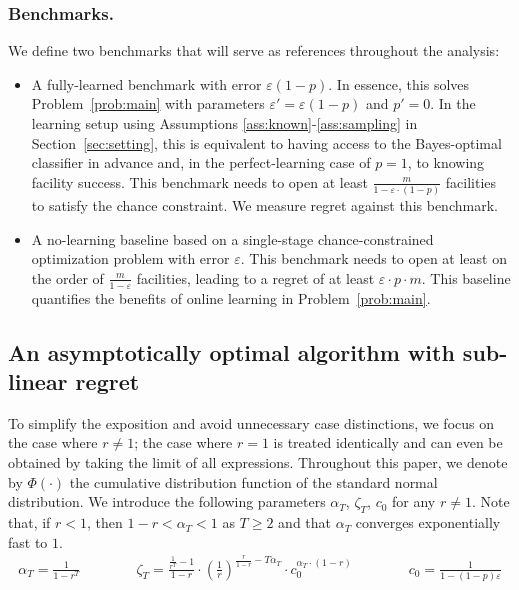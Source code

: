 \documentclass[nonblindrev]{informs3noheader}
\begin{document}
\subsubsection*{Benchmarks.}

We define two benchmarks that will serve as references throughout the analysis:
\begin{itemize}
	\item[--] A fully-learned benchmark with error $\varepsilon (1-p)$. In essence, this solves Problem~\ref{prob:main} with parameters $\varepsilon' = \varepsilon(1-p)$ and $p' = 0$. In the learning setup using Assumptions \ref{ass:known}-\ref{ass:sampling} in Section~\ref{sec:setting}, this is equivalent to having access to the Bayes-optimal classifier in advance and, in the perfect-learning case of $p=1$, to knowing facility success. This benchmark needs to open at least $\frac{m}{1-\varepsilon\cdot(1-p)}$ facilities to satisfy the chance constraint. We measure regret against this benchmark.
	\item[--] A no-learning baseline based on a single-stage chance-constrained optimization problem with error $\varepsilon$. This benchmark needs to open at least on the order of $\frac{m}{1-\varepsilon}$ facilities, leading to a regret of at least $\varepsilon\cdot p\cdot m$. This baseline quantifies the benefits of online learning in Problem~\eqref{prob:main}.
\end{itemize}

\subsection{An asymptotically optimal algorithm with sub-linear regret}

To simplify the exposition and avoid unnecessary case distinctions, we focus on the case where $r\neq1$; the case where $r=1$ is treated identically and can even be obtained by taking the limit of all expressions. Throughout this paper, we denote by $\Phi(\cdot)$ the cumulative distribution function of the standard normal distribution. We introduce the following parameters $\alpha_T$, $\zeta_T$, $c_0$ for any $r\neq1$. Note that, if $r<1$, then $1-r<\alpha_T<1$ as $T\geq2$ and that $\alpha_T$ converges exponentially fast to $1$.
\begin{align*}
	\alpha_T=\frac{1}{1-r^T}\qquad\qquad
	\zeta_T=\frac{\frac{1}{r^T}-1}{1-r}\cdot\left(\frac{1}{r}\right)^{\frac{r}{1-r}-T\alpha_T}\cdot c_0^{\alpha_T\cdot(1-r)} \qquad\qquad c_0 = \frac{1}{1-(1-p)\varepsilon}
\end{align*}
\end{document}

